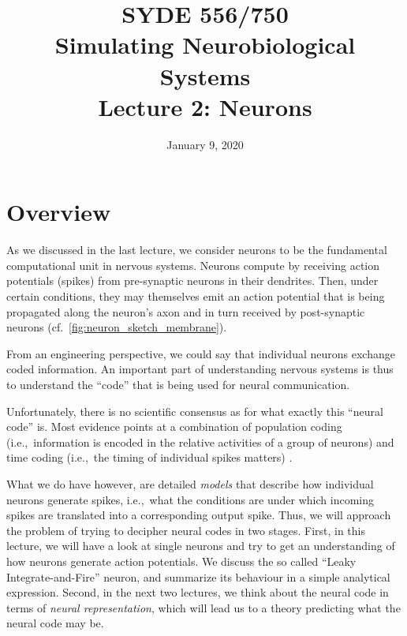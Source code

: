 \documentclass[10pt,letterpaper,oneside]{article}
\date{January 9, 2020}
\title{SYDE 556/750 \\ Simulating Neurobiological Systems \\ Lecture 2: Neurons}
\begin{document}

\section{Overview}


As we discussed in the last lecture, we consider neurons to be the fundamental computational unit in nervous systems. Neurons compute by receiving action potentials (spikes) from pre-synaptic neurons in their dendrites. Then, under certain conditions, they may themselves emit an action potential that is being propagated along the neuron's axon and in turn received by post-synaptic neurons (cf.~\cref{fig:neuron_sketch_membrane}).

From an engineering perspective, we could say that individual neurons exchange coded information. An important part of understanding nervous systems is thus to understand the \enquote{code} that is being used for neural communication.

Unfortunately, there is no scientific consensus as for what exactly this \enquote{neural code} is. Most evidence points at a combination of population coding (i.e.,~information is encoded in the relative activities of a group of neurons) and time coding (i.e.,~the timing of individual spikes matters) \cite{rieke1999spikes}.


What we do have however, are detailed \emph{models} that describe how individual neurons generate spikes, i.e.,~what the conditions are under which incoming spikes are translated into a corresponding output spike. Thus, we will approach the problem of trying to decipher neural codes in two stages. First, in this lecture, we will have a look at single neurons and try to get an understanding of how neurons generate action potentials. We discuss the so called \enquote{Leaky Integrate-and-Fire} neuron, and summarize its behaviour in a simple analytical expression. Second, in the next two lectures, we think about the neural code in terms of \emph{neural representation}, which will lead us to a theory predicting what the neural code may be.
\end{document}
